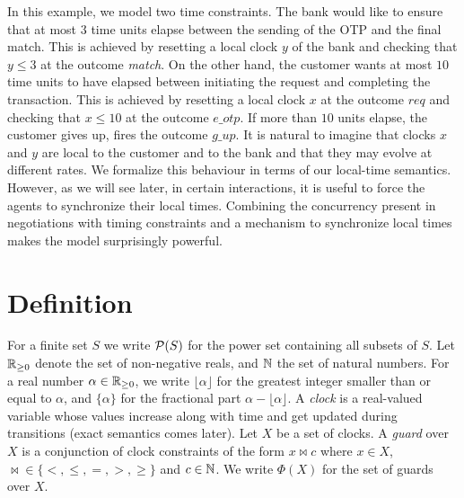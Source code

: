 In this example, we model two time constraints. The bank would like to ensure that at most $3$ time units elapse between the sending of the OTP and the final match. This is achieved by resetting a local clock $y$ of the bank and checking that $y \le 3$ at the outcome \emph{match}.  On the other hand, the customer wants at most $10$ time units to have elapsed between initiating the request and completing the transaction. This is achieved by resetting a local clock $x$ at the outcome $req$ and checking that $x \le 10$ at the outcome $e\_otp$. If more than $10$ units elapse, the customer gives up, fires the outcome $g\_up$.  It is natural to imagine that clocks $x$ and $y$ are local to the customer and to the bank and that they may evolve at different rates.  We formalize this behaviour in terms of our local-time semantics. However, as we will see later, in certain interactions, it is useful to force the agents to synchronize their local times. Combining the concurrency present in negotiations with timing constraints and a mechanism to synchronize local times makes the model surprisingly powerful.

\section{Definition}

For a finite set $S$ we write $\mathcal{P}(S)$ for the power set containing all subsets of $S$. Let $\mathbb{R}_{\ge 0}$ denote the set of non-negative reals, and $\mathbb{N}$ the set of natural numbers. For a real number $\alpha \in \mathbb{R}_{\ge 0}$, we write $\lfloor \alpha \rfloor$ for the greatest integer smaller than or equal to $\alpha$, and $\{ \alpha \}$ for the fractional part $\alpha - \lfloor \alpha \rfloor$. A \emph{clock} is a real-valued variable whose values increase along with time and get updated during transitions (exact semantics comes later). Let $X$ be a set of clocks. A \emph{guard} over $X$ is a conjunction of clock constraints of the form $x \bowtie c$ where $x \in X$, $\bowtie \in \{ <, \le, =, >, \ge \}$ and $c \in \mathbb{N}$. We write $\Phi(X)$ for the set of guards over $X$.

